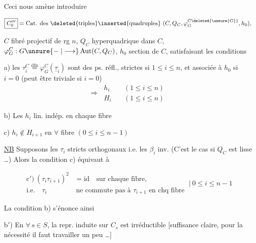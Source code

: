 Ceci nous amène  introduire

\[
\boxed{C_0'''}=\text{Cat. des }\deleted{\text{triples}}\inserted{\text{quadruples}}\ 
(C,Q_C,\varphi_G^{C\deleted{\unsure{G}}},h_0),
\]

$C$ fibré projectif de rg $n$, $Q_C$ hyperquadrique dans $C$, $\varphi_G^C:G\unsure{\relbar|\longrightarrow}\operatorname{Aut}(C,Q_C)$, $h_0$ section de $C$, satisfaisant les conditions

a) les $\tau_i^C\overset{\mathrm{dfn}}=\varphi_G^C(\underline{\tau}_i)$ sont des ps. réfl., strictes si $1\leq i\leq n$, et associée à $h_0$ si $i=0$ (peut être triviale si $i=0$)
\[
\Rightarrow\ \begin{aligned}
h_i&\quad(1\leq i\leq n)\\
H_i&\quad(1\leq i\leq n)
\end{aligned}
\]

b) Les $h_i$ lin. indép. en chaque fibre

c) $h_i\notin H_{i+1}$ en $\forall$ fibre \quad $(0\leq i\leq n-1)$


\uline{NB} Supposons les $\tau_i$ stricts orthogonaux  i.e. les $\beta_i$ inv. (C'est le cas si $Q_C$ est lisse \ldots) Alors la condition c) équivaut à

\[
\begin{aligned}
\text{c$'$)}\ (\tau_i\tau_{i+1})^2&=\mathrm{id}\quad\text{sur chaque fibre,}\\
\text{i.e.}\quad \tau_i&\ \text{ne commute pas à }\tau_{i+1}\text{ en chq fibre}
\end{aligned}
\ \Big|\ 0\leq i\leq n-1
\]

La condition b) s'énonce ainsi

b$'$) En $\forall\, s\in S$, la repr.  induite sur $C_s$ est irréductible [suffisance claire, pour la nécessité il faut travailler un peu \ldots]
\margin{?}

